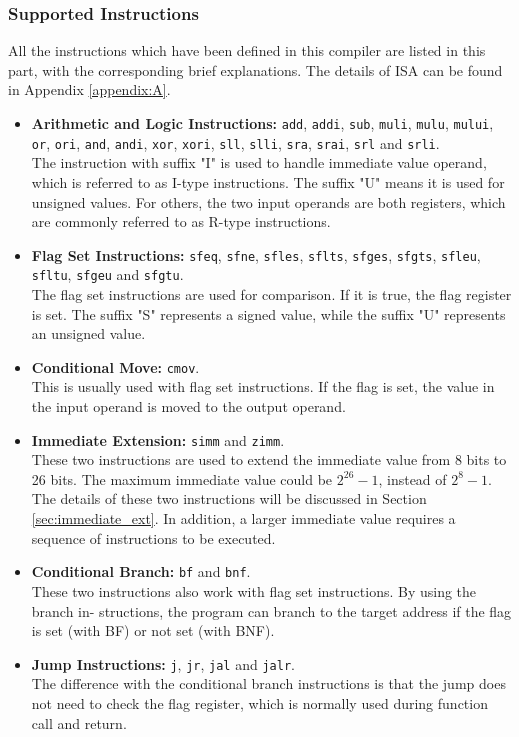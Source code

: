 \subsubsection{Supported Instructions}
All the instructions which have been defined in this compiler are listed in this part, with the corresponding brief explanations. The details of ISA can be found in Appendix \ref{appendix:A}.
\begin{itemize}
	\item \textbf{Arithmetic and Logic Instructions:} \texttt{add}, \texttt{addi}, \texttt{sub}, \texttt{muli}, \texttt{mulu}, \texttt{mului}, \texttt{or}, \texttt{ori}, \texttt{and}, \texttt{andi}, \texttt{xor}, \texttt{xori}, \texttt{sll}, \texttt{slli}, \texttt{sra}, \texttt{srai}, \texttt{srl} and \texttt{srli}.\\
The instruction with suffix "I" is used to handle immediate value operand, which is referred to as I-type instructions. The suffix "U" means it is used for unsigned values. For others, the two input operands are both registers, which are commonly referred to as R-type instructions.
	\item \textbf{Flag Set Instructions:} \texttt{sfeq}, \texttt{sfne}, \texttt{sfles}, \texttt{sflts}, \texttt{sfges}, \texttt{sfgts}, \texttt{sfleu}, \texttt{sfltu}, \texttt{sfgeu} and \texttt{sfgtu}.\\
The flag set instructions are used for comparison. If it is true, the flag register is set. The suffix "S" represents a signed value, while the suffix "U" represents an unsigned value.
	\item \textbf{Conditional Move:} \texttt{cmov}.\\ This is usually used with flag set instructions. If the flag is set, the value in the input operand is moved to the output operand.
	\item \textbf{Immediate Extension:} \texttt{simm} and \texttt{zimm}.\\ These two instructions are used to extend the immediate value from 8 bits to 26 bits. The maximum immediate value could be $2^{26}-1$, instead of $2^8-1$. The details of these two instructions will be discussed in Section \ref{sec:immediate_ext}. In addition, a larger immediate value requires a sequence of instructions to be executed.
	\item \textbf{Conditional Branch:} \texttt{bf} and \texttt{bnf}.\\ These two instructions also work with flag set instructions. By using the branch in- structions, the program can branch to the target address if the flag is set (with BF) or not set (with BNF).
	\item \textbf{Jump Instructions:} \texttt{j}, \texttt{jr}, \texttt{jal} and \texttt{jalr}.\\ The difference with the conditional branch instructions is that the jump does not need to check the flag register, which is normally used during function call and return.
\end{itemize}

